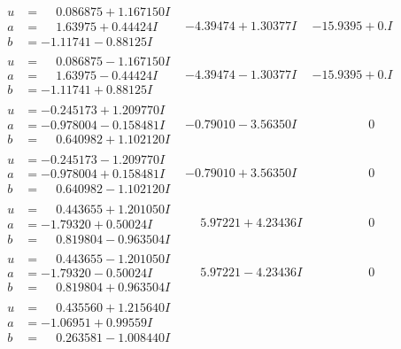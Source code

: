 \documentclass[1p]{elsarticle_modified}
\theoremstyle{definition}
\begin{document}
$$\begin{array}{c|c|c}
\begin{aligned}
u &= \phantom{-}0.086875 + 1.167150 I \\
a &= \phantom{-}1.63975 + 0.44424 I \\
b &= -1.11741 - 0.88125 I\end{aligned}
 & -4.39474 + 1.30377 I & -15.9395 + 0. I\phantom{ +0.000000I} \\ \hline\begin{aligned}
u &= \phantom{-}0.086875 - 1.167150 I \\
a &= \phantom{-}1.63975 - 0.44424 I \\
b &= -1.11741 + 0.88125 I\end{aligned}
 & -4.39474 - 1.30377 I & -15.9395 + 0. I\phantom{ +0.000000I} \\ \hline\begin{aligned}
u &= -0.245173 + 1.209770 I \\
a &= -0.978004 - 0.158481 I \\
b &= \phantom{-}0.640982 + 1.102120 I\end{aligned}
 & -0.79010 - 3.56350 I & \phantom{-0.000000 } 0 \\ \hline\begin{aligned}
u &= -0.245173 - 1.209770 I \\
a &= -0.978004 + 0.158481 I \\
b &= \phantom{-}0.640982 - 1.102120 I\end{aligned}
 & -0.79010 + 3.56350 I & \phantom{-0.000000 } 0 \\ \hline\begin{aligned}
u &= \phantom{-}0.443655 + 1.201050 I \\
a &= -1.79320 + 0.50024 I \\
b &= \phantom{-}0.819804 - 0.963504 I\end{aligned}
 & \phantom{-}5.97221 + 4.23436 I & \phantom{-0.000000 } 0 \\ \hline\begin{aligned}
u &= \phantom{-}0.443655 - 1.201050 I \\
a &= -1.79320 - 0.50024 I \\
b &= \phantom{-}0.819804 + 0.963504 I\end{aligned}
 & \phantom{-}5.97221 - 4.23436 I & \phantom{-0.000000 } 0 \\ \hline\begin{aligned}
u &= \phantom{-}0.435560 + 1.215640 I \\
a &= -1.06951 + 0.99559 I \\
b &= \phantom{-}0.263581 - 1.008440 I\end{aligned}

\end{array}$$
\end{document}
